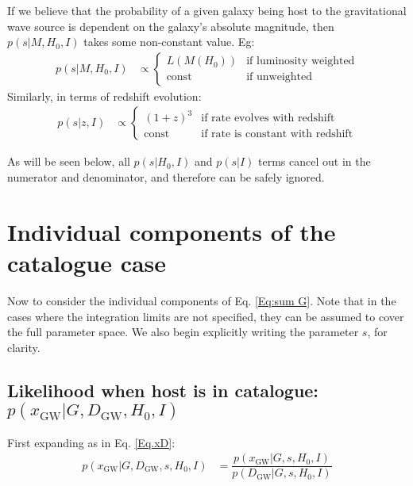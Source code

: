 \documentclass[a4paper,10pt]{article}
\begin{document}
If we believe that the probability of a given galaxy being host to the gravitational wave source is dependent on the galaxy's absolute magnitude, then $p(s|M,H_0,I)$ takes some non-constant value.  Eg:
\begin{equation}
\begin{aligned}
p(s|M,H_0,I) &\propto 
\begin{cases}
L(M(H_0)) & \text{if luminosity weighted}\\
\text{const} & \text{if unweighted}
\end{cases}
\end{aligned}
\end{equation}
Similarly, in terms of redshift evolution:
\begin{equation}
\begin{aligned}
p(s|z,I) &\propto 
\begin{cases}
(1+z)^3 & \text{if rate evolves with redshift}\\
\text{const} & \text{if rate is constant with redshift}
\end{cases}
\end{aligned}
\end{equation}

As will be seen below, all $p(s|H_0,I)$ and $p(s|I)$ terms cancel out in the numerator and denominator, and therefore can be safely ignored.






\section{Individual components of the catalogue case \label{Sec: Components}}
Now to consider the individual components of Eq. \ref{Eq:sum G}.  Note that in the cases where the integration limits are not specified, they can be assumed to cover the full parameter space. We also begin explicitly writing the parameter $s$, for clarity.


\subsection{Likelihood when host is in catalogue: \boldmath$p(x_{\text{GW}}|G,D_{\text{GW}},H_0,I)$ \label{sec:p(x|G,D,H_0,I)}}

First expanding as in Eq. \ref{Eq.xD}:
\begin{equation}
\label{Eq:x_GDH0}
\begin{aligned}
p(x_{\text{GW}}|G,D_{\text{GW}},s,H_0,I) &= \dfrac{p(x_{\text{GW}}|G,s,H_0,I)}{p(D_{\text{GW}}|G,s,H_0,I)}
\end{aligned}
\end{equation}
\end{document}
